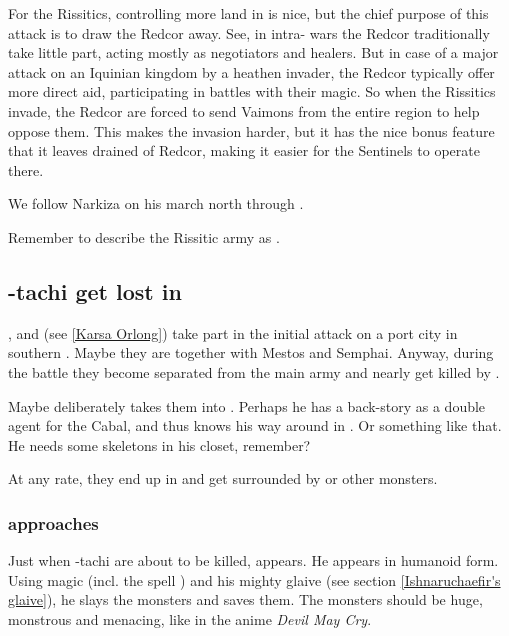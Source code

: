 For the Rissitics, controlling more land in \Velcad{} is nice, but the chief purpose of this attack is to draw the Redcor away. See, in intra-\Velcadian{} wars the Redcor traditionally take little part, acting mostly as negotiators and healers. But in case of a major attack on an Iquinian kingdom by a heathen invader, the Redcor typically offer more direct aid, participating in battles with their magic. So when the Rissitics invade, the Redcor are forced to send Vaimons from the entire region to help oppose them. 
This makes the invasion harder, but it has the nice bonus feature that it leaves \Malcur drained of Redcor, making it easier for the Sentinels to operate there. 

We follow Narkiza on his march north through \Scyrum. 



Remember to describe the Rissitic army as .







\subsection{\Shilred-tachi get lost in \Nyx}
\Shilred{}, \Dzasselid{} and \KarsaOrlong{} (see \ref{Karsa Orlong}) take part in the initial attack on a port city in southern \Scyrum. Maybe they are together with Mestos and Semphai. Anyway, during the battle they become separated from the main army and nearly get killed by \banes. %

Maybe \Dzasselid{} deliberately takes them into \Nyx. Perhaps he has a back-story as a double agent for the Cabal, and thus knows his way around in \Nyx. Or something like that. He needs some skeletons in his closet, remember?

At any rate, they end up in \Nyx{} and get surrounded by \banes{} or other monsters. 






\subsubsection{\Ishnaruchaefir{} approaches}
Just when \Shilred-tachi are about to be killed, \Ishnaruchaefir{} appears. He appears in humanoid form. Using magic (incl. the spell ) and his mighty glaive (see section \ref{Ishnaruchaefir's glaive}), he slays the monsters and saves them. The monsters should be huge, monstrous and menacing, like in the anime \emph{Devil May Cry}. 

